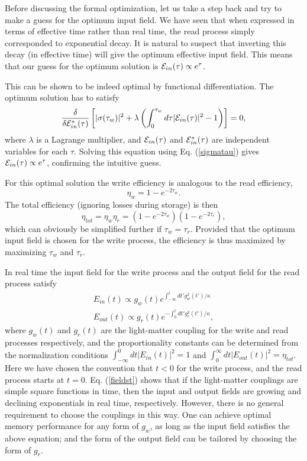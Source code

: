 \documentclass[aps,prl,twocolumn]{revtex4}
\begin{document}
Before discussing the formal optimization, let us take a step back and try to make a guess for the optimum input field. We have seen that when expressed in terms of effective time rather than real time, the read process simply corresponded to exponential decay. It is natural to suspect that inverting this decay (in effective time) will give the optimum effective input field. This means that our guess for the optimum solution is ${\cal E}_{in}(\tau) \propto e^{\tau}$.

This can be shown to be indeed optimal by functional differentiation. The optimum solution has to satisfy
\begin{equation}
\frac{\delta}{\delta {\cal E}_{in}^*(\tau)} \left[ |\sigma(\tau_w)|^2
+ \lambda \left(\int_0^{\tau_w} d\tau |{\cal E}_{in}(\tau)|^2 - 1 \right)  \right]=0,
\end{equation}
where $\lambda$ is a Lagrange multiplier, and ${\cal E}_{in}(\tau)$ and ${\cal E}_{in}^*(\tau)$ are independent variables for each $\tau$. Solving this equation using Eq. (\ref{sigmatau}) gives ${\cal E}_{in}(\tau) \propto e^{\tau}$, confirming the intuitive guess.

For this optimal solution the write efficiency is analogous to the read efficiency,
\begin{equation}
\eta_w=1-e^{-2 \tau_w}.
\end{equation}
The total efficiency (ignoring losses during storage) is then
\begin{equation}
\eta_{tot}=\eta_w \eta_r = (1-e^{-2 \tau_w})(1-e^{-2 \tau_r}),
\end{equation}
which can obviously be simplified further if $\tau_w=\tau_r$.
Provided that the optimum input field is chosen for the write process, the efficiency is thus maximized by maximizing $\tau_w$ and $\tau_r$.


In real time the input field for the write process and the output field for the read process satisfy
\begin{eqnarray}
E_{in}(t) \propto g_w(t) e^{\int_{-\infty}^t dt' g_w^2(t')/\kappa} \nonumber\\
E_{out}(t) \propto g_r(t) e^{-\int_0^t dt' g_r^2(t')/\kappa},
\label{fieldst}
\end{eqnarray}
where $g_w(t)$ and $g_r(t)$ are the light-matter coupling for the write and read processes respectively, and the proportionality constants can be determined from the normalization conditions $\int_{-\infty}^0 dt |E_{in}(t)|^2=1$ and $\int_0^{\infty} dt |E_{out}(t)|^2=\eta_{tot}$. Here we have chosen the convention that $t<0$ for the write process, and the read process starts at $t=0$.
Eq. (\ref{fieldst}) shows that if the light-matter couplings are simple square functions in time, then the input and output fields are growing and declining exponentials in real time, respectively. However, there is no general requirement to choose the couplings in this way. One can achieve optimal memory performance for any form of $g_w$, as long as the input field satisfies the above equation; and the form of the output field can be tailored by choosing the form of $g_r$.
\end{document}
